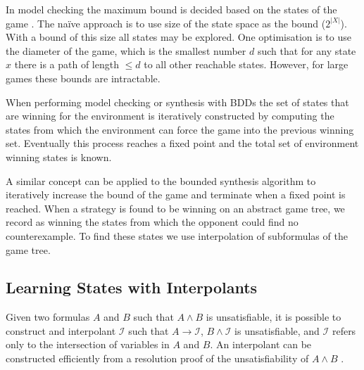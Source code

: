\documentclass{llncs}
\begin{document}
In model checking the maximum bound is decided based on the states of the game
\cite{biere1999}. The na\"ive approach is to use size of the state space as the
bound ($2^{|X|}$). With a bound of this size all states may be explored. One
optimisation is to use the diameter of the game, which is the smallest number
$d$ such that for any state $x$ there is a path of length $\leq d$ to all other
reachable states. However, for large games these bounds are intractable.

When performing model checking or synthesis with BDDs \cite{burch1990} the set
of states that are winning for the environment is iteratively constructed by
computing the states from which the environment can force the game into the
previous winning set. Eventually this process reaches a fixed point and the
total set of environment winning states is known.

A similar concept can be applied to the bounded synthesis algorithm to
iteratively increase the bound of the game and terminate when a fixed point is
reached. When a strategy is found to be winning on an abstract game tree, we
record as winning the states from which the opponent could find no
counterexample. To find these states we use interpolation of subformulas of the
game tree.

\subsection{Learning States with Interpolants}

Given two formulas $A$ and $B$ such that $A \land B$ is unsatisfiable, it is
possible to construct and interpolant $\mathcal{I}$ such that $A \to
\mathcal{I}$, $B \land \mathcal{I}$ is unsatisfiable, and $\mathcal{I}$ refers
only to the intersection of variables in $A$ and $B$. An interpolant can be
constructed efficiently from a resolution proof of the unsatisfiability of $A
\land B$ \cite{pudlak1997}.





\end{document}
